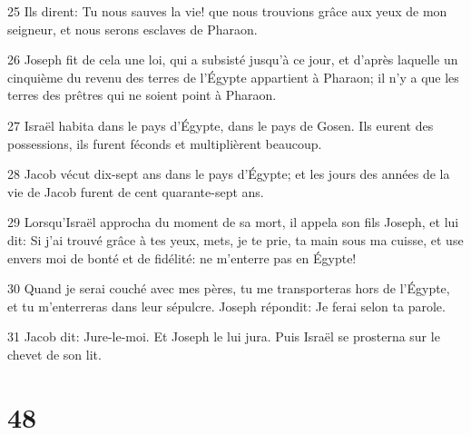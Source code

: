 \par 25 Ils dirent: Tu nous sauves la vie! que nous trouvions grâce aux yeux de mon seigneur, et nous serons esclaves de Pharaon.
\par 26 Joseph fit de cela une loi, qui a subsisté jusqu'à ce jour, et d'après laquelle un cinquième du revenu des terres de l'Égypte appartient à Pharaon; il n'y a que les terres des prêtres qui ne soient point à Pharaon.
\par 27 Israël habita dans le pays d'Égypte, dans le pays de Gosen. Ils eurent des possessions, ils furent féconds et multiplièrent beaucoup.
\par 28 Jacob vécut dix-sept ans dans le pays d'Égypte; et les jours des années de la vie de Jacob furent de cent quarante-sept ans.
\par 29 Lorsqu'Israël approcha du moment de sa mort, il appela son fils Joseph, et lui dit: Si j'ai trouvé grâce à tes yeux, mets, je te prie, ta main sous ma cuisse, et use envers moi de bonté et de fidélité: ne m'enterre pas en Égypte!
\par 30 Quand je serai couché avec mes pères, tu me transporteras hors de l'Égypte, et tu m'enterreras dans leur sépulcre. Joseph répondit: Je ferai selon ta parole.
\par 31 Jacob dit: Jure-le-moi. Et Joseph le lui jura. Puis Israël se prosterna sur le chevet de son lit.

\chapter{48}

